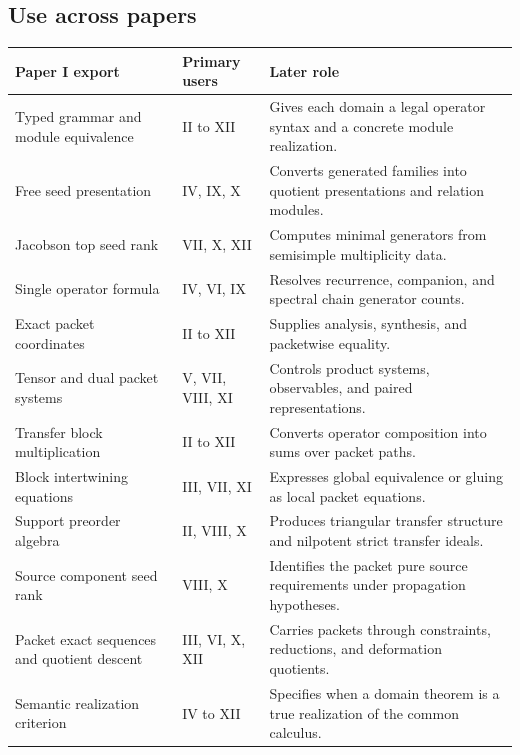 \subsection{Use across papers}
\begin{center}
\begin{longtable}{@{}>{\raggedright\arraybackslash}p{}>{\raggedright\arraybackslash}p{}>{\raggedright\arraybackslash}p{}@{}}
\toprule
\textbf{Paper I export} & \textbf{Primary users} & \textbf{Later role}\\
\midrule
\endhead
Typed grammar and module equivalence & II to XII & Gives each domain a legal operator syntax and a concrete module realization.\\
Free seed presentation & IV, IX, X & Converts generated families into quotient presentations and relation modules.\\
Jacobson top seed rank & VII, X, XII & Computes minimal generators from semisimple multiplicity data.\\
Single operator formula & IV, VI, IX & Resolves recurrence, companion, and spectral chain generator counts.\\
Exact packet coordinates & II to XII & Supplies analysis, synthesis, and packetwise equality.\\
Tensor and dual packet systems & V, VII, VIII, XI & Controls product systems, observables, and paired representations.\\
Transfer block multiplication & II to XII & Converts operator composition into sums over packet paths.\\
Block intertwining equations & III, VII, XI & Expresses global equivalence or gluing as local packet equations.\\
Support preorder algebra & II, VIII, X & Produces triangular transfer structure and nilpotent strict transfer ideals.\\
Source component seed rank & VIII, X & Identifies the packet pure source requirements under propagation hypotheses.\\
Packet exact sequences and quotient descent & III, VI, X, XII & Carries packets through constraints, reductions, and deformation quotients.\\
Semantic realization criterion & IV to XII & Specifies when a domain theorem is a true realization of the common calculus.\\
\bottomrule
\end{longtable}
\end{center}


